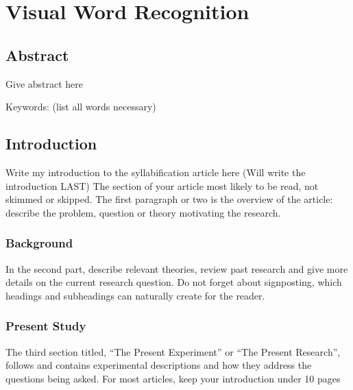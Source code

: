 
\chapter{Visual Word Recognition} %

\label{Chapter4} %

\section{Abstract}

Give abstract here

Keywords: (list all words necessary)


\section{Introduction}

Write my introduction to the syllabification article here (Will write the introduction LAST)
The section of your article most likely to be read, not skimmed or skipped. The first paragraph or two is the overview of the article: describe the problem, question or theory motivating the research. 

\subsection{Background}

In the second part, describe relevant theories, review past research and give more details on the current research question. Do not forget about signposting, which headings and subheadings can naturally create for the reader.


\subsection{Present Study}
The third section titled, “The Present Experiment” or “The Present Research”, follows and contains experimental descriptions and how they address the questions being asked.
For most articles, keep your introduction under 10 pages

